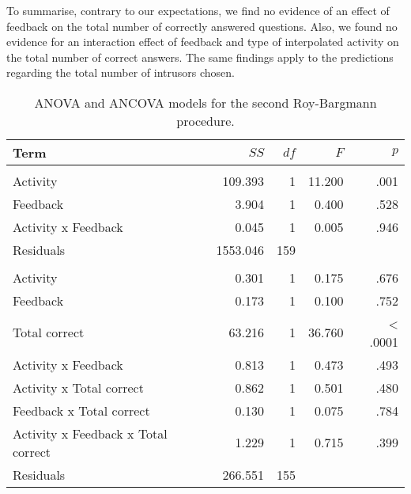 \documentclass[
  11pt,
]{article}
\begin{document}
To summarise, contrary to our expectations, we find no evidence of an
effect of feedback on the total number of correctly answered questions.
Also, we found no evidence for an interaction effect of feedback and
type of interpolated activity on the total number of correct answers.
The same findings apply to the predictions regarding the total number of
intrusors chosen.

\begin{table*}

\caption{\label{tab:rb2Table}\label{rb2-table}ANOVA and ANCOVA models for the second Roy-Bargmann
                     procedure.}
\centering
\begin{tabular}[t]{lrrrr}
\toprule
Term & $SS$ & $df$ & $F$ & $p$\\
\midrule
\addlinespace[0.3em]
\multicolumn{5}{l}{\textbf{ANOVA}}\\
\hspace{1em}Activity & 109.393 & 1 & 11.200 & .001\\
\hspace{1em}Feedback & 3.904 & 1 & 0.400 & .528\\
\hspace{1em}Activity x Feedback & 0.045 & 1 & 0.005 & .946\\
\hspace{1em}Residuals & 1553.046 & 159 &  & \\
\addlinespace[0.3em]
\multicolumn{5}{l}{\textbf{ANCOVA}}\\
\hspace{1em}Activity & 0.301 & 1 & 0.175 & .676\\
\hspace{1em}Feedback & 0.173 & 1 & 0.100 & .752\\
\hspace{1em}Total correct & 63.216 & 1 & 36.760 & < .0001\\
\hspace{1em}Activity x Feedback & 0.813 & 1 & 0.473 & .493\\
\hspace{1em}Activity x Total correct & 0.862 & 1 & 0.501 & .480\\
\hspace{1em}Feedback x Total correct & 0.130 & 1 & 0.075 & .784\\
\hspace{1em}Activity x Feedback x Total correct & 1.229 & 1 & 0.715 & .399\\
\hspace{1em}Residuals & 266.551 & 155 &  & \\
\bottomrule
\end{tabular}
\end{table*}
\end{document}
